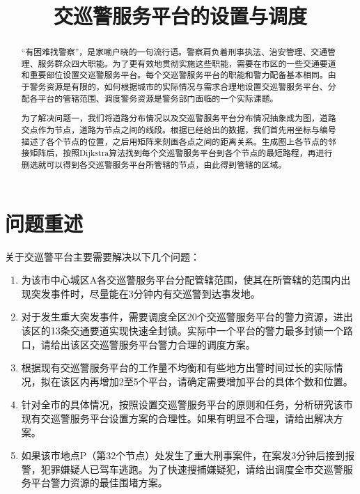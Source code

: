 \documentclass{cumcmthesis}
\title{交巡警服务平台的设置与调度}
\begin{document}
\maketitle

\tableofcontents

\newpage
\begin{abstract}
  “有困难找警察”，是家喻户晓的一句流行语。警察肩负着刑事执法、治安管理、交通管理、服务群众四大职能。为了更有效地贯彻实施这些职能，需要在市区的一些交通要道和重要部位设置交巡警服务平台。每个交巡警服务平台的职能和警力配备基本相同。由于警务资源是有限的，如何根据城市的实际情况与需求合理地设置交巡警服务平台、分配各平台的管辖范围、调度警务资源是警务部门面临的一个实际课题。

  为了解决问题一，我们将道路分布情况以及交巡警服务平台分布情况抽象成为图，道路交点作为节点，道路为节点之间的线段。根据已经给出的数据，我们首先用坐标与编号描述了各个节点的位置，之后用矩阵来刻画各点之间的距离关系。生成图上各节点的邻接矩阵后，按照Dijkstra算法找到每个交巡警服务平台到各个节点的最短路程，再进行删选就可以得到各交巡警服务平台所管辖的节点，由此得到管辖的区域。
\end{abstract}

\section{问题重述}
  关于交巡警平台主要需要解决以下几个问题：

  \begin{enumerate}
    \item 为该市中心城区A各交巡警服务平台分配管辖范围，使其在所管辖的范围内出现突发事件时，尽量能在3分钟内有交巡警到达事发地。
    \item 对于发生重大突发事件，需要调度全区20个交巡警服务平台的警力资源，进出该区的13条交通要道实现快速全封锁。实际中一个平台的警力最多封锁一个路口，请给出该区交巡警服务平台警力合理的调度方案。
    \item 根据现有交巡警服务平台的工作量不均衡和有些地方出警时间过长的实际情况，拟在该区内再增加2至5个平台，请确定需要增加平台的具体个数和位置。
    \item 针对全市的具体情况，按照设置交巡警服务平台的原则和任务，分析研究该市现有交巡警服务平台设置方案的合理性。如果有明显不合理，请给出解决方案。
    \item 如果该市地点P（第32个节点）处发生了重大刑事案件，在案发3分钟后接到报警，犯罪嫌疑人已驾车逃跑。为了快速搜捕嫌疑犯，请给出调度全市交巡警服务平台警力资源的最佳围堵方案。
  \end{enumerate}
\end{document}
